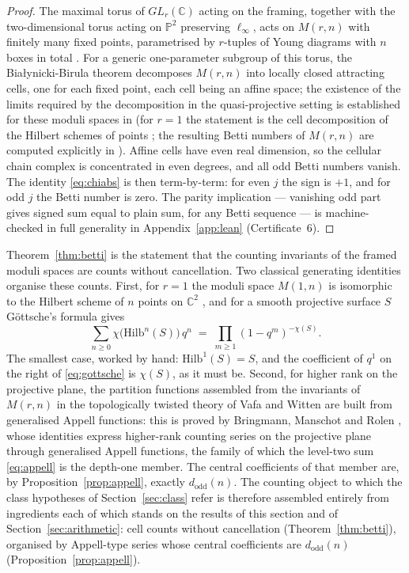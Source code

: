 \documentclass[11pt,a4paper]{article}
\newcommand{\C}{\mathbb{C}}
\newcommand{\PP}{\mathbb{P}}
\newcommand{\dodd}{d_{\mathrm{odd}}}
\newcommand{\Hilb}{\mathrm{Hilb}}
\newcommand{\Mod}{M}
\theoremstyle{plain}
\theoremstyle{definition}
\theoremstyle{remark}
\begin{document}
\begin{proof}
The maximal torus of $GL_r(\C)$ acting on the framing, together with the two-dimensional torus acting on $\PP^2$ preserving $\ell_\infty$, acts on $\Mod(r,n)$ with finitely many fixed points, parametrised by $r$-tuples of Young diagrams with $n$ boxes in total \cite{NakajimaYoshioka}. For a generic one-parameter subgroup of this torus, the Bia{\l}ynicki-Birula theorem \cite{BB} decomposes $\Mod(r,n)$ into locally closed attracting cells, one for each fixed point, each cell being an affine space; the existence of the limits required by the decomposition in the quasi-projective setting is established for these moduli spaces in \cite{NakajimaYoshioka} (for $r = 1$ the statement is the cell decomposition of the Hilbert schemes of points \cite{NakajimaLectures}; the resulting Betti numbers of $\Mod(r,n)$ are computed explicitly in \cite{NYlectures}). Affine cells have even real dimension, so the cellular chain complex is concentrated in even degrees, and all odd Betti numbers vanish. The identity \eqref{eq:chiabs} is then term-by-term: for even $j$ the sign is $+1$, and for odd $j$ the Betti number is zero. The parity implication --- vanishing odd part gives signed sum equal to plain sum, for any Betti sequence --- is machine-checked in full generality in Appendix~\ref{app:lean} (Certificate~6).
\end{proof}

Theorem~\ref{thm:betti} is the statement that the counting invariants of the framed moduli spaces are counts without cancellation. Two classical generating identities organise these counts. First, for $r = 1$ the moduli space $\Mod(1,n)$ is isomorphic to the Hilbert scheme of $n$ points on $\C^2$ \cite{NakajimaLectures}, and for a smooth projective surface $S$ G\"ottsche's formula \cite{Gottsche} gives
\begin{equation}\label{eq:gottsche}
  \sum_{n \ge 0} \chi\bigl(\Hilb^n(S)\bigr)\, q^n
  \;=\; \prod_{m \ge 1} (1 - q^m)^{-\chi(S)} .
\end{equation}
The smallest case, worked by hand: $\Hilb^1(S) = S$, and the coefficient of $q^1$ on the right of \eqref{eq:gottsche} is $\chi(S)$, as it must be. Second, for higher rank on the projective plane, the partition functions assembled from the invariants of $\Mod(r,n)$ in the topologically twisted theory of Vafa and Witten \cite{VafaWitten} are built from generalised Appell functions: this is proved by Bringmann, Manschot and Rolen \cite{BMR}, whose identities express higher-rank counting series on the projective plane through generalised Appell functions, the family of which the level-two sum \eqref{eq:appell} is the depth-one member. The central coefficients of that member are, by Proposition~\ref{prop:appell}, exactly $\dodd(n)$. The counting object to which the class hypotheses of Section~\ref{sec:class} refer is therefore assembled entirely from ingredients each of which stands on the results of this section and of Section~\ref{sec:arithmetic}: cell counts without cancellation (Theorem~\ref{thm:betti}), organised by Appell-type series whose central coefficients are $\dodd(n)$ (Proposition~\ref{prop:appell}).
\end{document}
